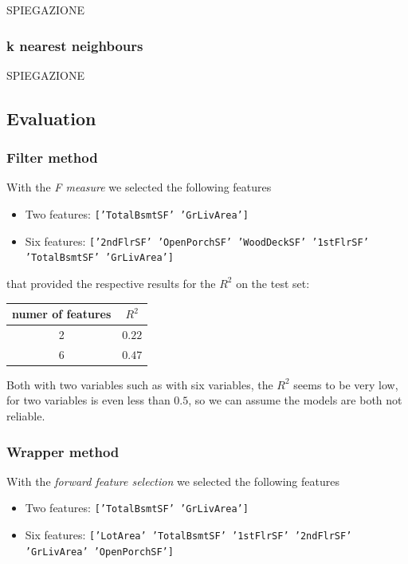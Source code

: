 \documentclass[a4paper,oneside,12pt]{article}
\begin{document}
SPIEGAZIONE

\subsubsection{k nearest neighbours}

SPIEGAZIONE

\subsection{Evaluation}

\subsubsection{Filter method}

With the \textit{F measure} we selected the following features 

\begin{itemize}
\item Two features: \texttt{['TotalBsmtSF' 'GrLivArea']} 
\item Six features:  \texttt{['2ndFlrSF' 'OpenPorchSF' 'WoodDeckSF' '1stFlrSF' 'TotalBsmtSF' 'GrLivArea']}
\end{itemize}

that provided the respective results for the $R^2$ on the test set:
\begin{table}[H]
\centering
\begin{tabular}{|c|c|}
\hline
numer of features & $R^2$ \\
\hline
2  & $0.22$ \\
\hline
6  & $0.47$ \\
\hline

\end{tabular}
\end{table}


Both with two variables such as with six variables, the $R^2$ seems to be very low, for two variables is even less than $0.5$, so we can assume the models are both not reliable.

\subsubsection{Wrapper method}

With the \textit{forward feature selection} we selected the following features 

\begin{itemize}
\item Two features: \texttt{['TotalBsmtSF' 'GrLivArea']} 
\item Six features:  \texttt{['LotArea' 'TotalBsmtSF' '1stFlrSF' '2ndFlrSF' 'GrLivArea' 'OpenPorchSF']}
\end{itemize}
\end{document}

